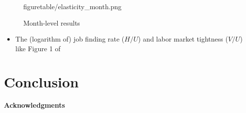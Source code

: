 \documentclass[12pt]{article}
\begin{document}
\begin{figure}[!ht]
\begin{center}
{  {figuretable/elasticity_month.png}}
  \caption{Month-level results}
  \label{fg:month_level_results} 
  \end{center}
  \footnotesize
\end{figure} 

\begin{itemize}
    \item The (logarithm of) job finding rate ($H/U$) and labor market tightness ($V/U$) like Figure 1 of \cite{borowczyk2013accounting}
    
\end{itemize}

\section{Conclusion}


\paragraph{Acknowledgments}





\end{document}
